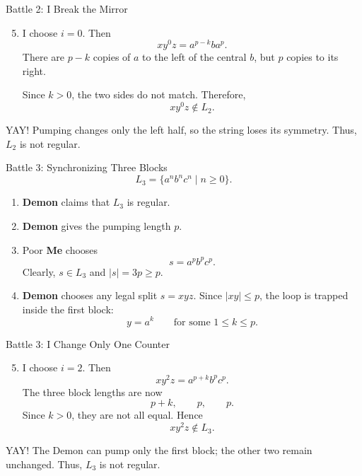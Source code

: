 \documentclass[10pt,aspectratio=169]{beamer}
\newcommand{\Demon}{\textbf{\alert{Demon}}}
\newcommand{\Me}{\textbf{\color{blue!70!black}Me}}
\begin{document}
\begin{frame}{Battle 2: I Break the Mirror}
\small
\begin{enumerate}
    \setcounter{enumi}{4}
    \item I choose $i=0$. Then
    \[
    xy^0z=a^{p-k}ba^p.
    \]
    There are $p-k$ copies of $a$ to the left of the central $b$, but
    $p$ copies to its right.

    Since $k>0$, the two sides do not match. Therefore,
    \[
    xy^0z\notin L_2.
    \]
\end{enumerate}

\begin{block}{YAY!}
Pumping changes only the left half, so the string loses its symmetry.
Thus, $L_2$ is not regular.
\end{block}
\end{frame}

\begin{frame}{Battle 3: Synchronizing Three Blocks}
\small
\[
L_3=\{a^nb^nc^n\mid n\geq 0\}.
\]

\begin{enumerate}
    \item \Demon{} claims that $L_3$ is regular.
    \item \Demon{} gives the pumping length $p$.
    \item Poor \Me{} chooses
    \[
    s=a^pb^pc^p.
    \]
    Clearly, $s\in L_3$ and $|s|=3p\geq p$.
    \item \Demon{} chooses any legal split $s=xyz$.
          Since $|xy|\leq p$, the loop is trapped inside the first block:
    \[
    y=a^k
    \qquad\text{for some }1\leq k\leq p.
    \]
\end{enumerate}
\end{frame}

\begin{frame}{Battle 3: I Change Only One Counter}
\small
\begin{enumerate}
    \setcounter{enumi}{4}
    \item I choose $i=2$. Then
    \[
    xy^2z=a^{p+k}b^pc^p.
    \]
    The three block lengths are now
    \[
    p+k,\qquad p,\qquad p.
    \]
    Since $k>0$, they are not all equal. Hence
    \[
    xy^2z\notin L_3.
    \]
\end{enumerate}

\begin{block}{YAY!}
The Demon can pump only the first block; the other two remain unchanged.
Thus, $L_3$ is not regular.
\end{block}
\end{frame}
\end{document}
